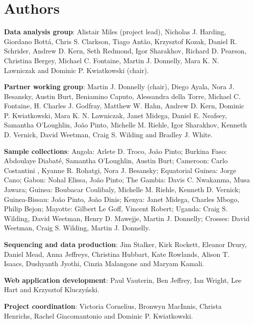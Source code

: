 \documentclass[a4paper,11pt,abstracton,hidelinks]{scrartcl}
\begin{document}
\section*{Authors}

%
\textbf{Data analysis group}: Alistair Miles (project lead), Nicholas J. Harding, Giordano Bott\'{a}, Chris S. Clarkson, Tiago Ant\~{a}o, Krzysztof Kozak, Daniel R. Schrider, Andrew D. Kern, Seth Redmond, Igor Sharakhov, Richard D. Pearson, Christina Bergey, Michael C. Fontaine, Martin J. Donnelly, Mara K. N. Lawniczak and Dominic P. Kwiatkowski (chair).

%
\textbf{Partner working group}: Martin J. Donnelly (chair), Diego Ayala, Nora J. Besansky, Austin Burt, Beniamino Caputo, Alessandra della Torre, Michael C. Fontaine, H. Charles J. Godfray, Matthew W. Hahn, Andrew D. Kern, Dominic P. Kwiatkowski, Mara K. N. Lawniczak, Janet Midega, Daniel E. Neafsey, Samantha O'Loughlin, Jo\~{a}o Pinto, Michelle M. Riehle, Igor Sharakhov, Kenneth D. Vernick, David Weetman, Craig S. Wilding and Bradley J. White.

%
\textbf{Sample collections}: Angola: Arlete D. Troco, Jo\~{a}o Pinto; Burkina Faso: Abdoulaye Diabat\'{e}, Samantha O'Loughlin, Austin Burt; Cameroon: Carlo Costantini , Kyanne R. Rohatgi, Nora J. Besansky; Equatorial Guinea: Jorge Cano; Gabon: Nohal Elissa, Jo\~{a}o Pinto; The Gambia: Davis C. Nwakanma, Musa Jawara; Guinea: Boubacar Coulibaly, Michelle M. Riehle, Kenneth D. Vernick; Guinea-Bissau: Jo\~{a}o Pinto, Jo\~{a}o Dinis; Kenya: Janet Midega, Charles Mbogo, Philip Bejon; Mayotte: Gilbert Le Goff, Vincent Robert; Uganda: Craig S. Wilding, David Weetman, Henry D. Mawejje, Martin J. Donnelly; Crosses: David Weetman, Craig S. Wilding, Martin J. Donnelly.

%
\textbf{Sequencing and data production}: Jim Stalker, Kirk Rockett, Eleanor Drury, Daniel Mead, Anna Jeffreys, Christina Hubbart, Kate Rowlands, Alison T. Isaacs, Dushyanth Jyothi, Cinzia Malangone and Maryam Kamali.

%
\textbf{Web application development}: Paul Vauterin, Ben Jeffrey, Ian Wright, Lee Hart and Krzysztof Kluczy\'{n}ski.

%
\textbf{Project coordination}: Victoria Cornelius, Bronwyn MacInnis, Christa Henrichs, Rachel Giacomantonio and Dominic P. Kwiatkowski.



\end{document}
